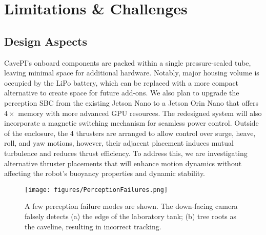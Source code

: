 \section{Limitations \& Challenges}

\subsection{Design Aspects}
CavePI’s onboard components are packed within a single pressure-sealed tube, leaving minimal space for additional hardware. Notably, major housing volume is occupied by the LiPo battery, which can be replaced with a more compact alternative to create space for future add-ons. We also plan to upgrade the perception SBC from the existing Jetson Nano to a Jetson Orin Nano that offers $4\times$ memory with more advanced GPU resources. The redesigned system will also incorporate a magnetic switching mechanism for seamless power control. Outside of the enclosure, the 4 thrusters are arranged to allow control over surge, heave, roll, and yaw motions, however, their adjacent placement induces mutual turbulence and reduces thrust efficiency. To address this, we are investigating alternative thruster placements that will enhance motion dynamics without affecting the robot's buoyancy properties and dynamic stability.

\begin{figure}[t]
    \centering
    \texttt{[image: figures/PerceptionFailures.png]}%
    \caption{A few perception failure modes are shown. The down-facing camera falsely detects (a) the edge of the laboratory tank; (b) tree roots as the caveline, resulting in incorrect tracking.
    }%
    \vspace{-2mm}
    \label{fig:perception_failure}
\end{figure}

